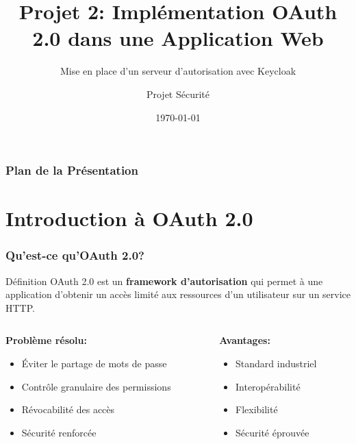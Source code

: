\documentclass[aspectratio=169]{beamer}
\title[OAuth 2.0 avec Keycloak]{Projet 2: Implémentation OAuth 2.0 dans une Application Web}
\subtitle{Mise en place d'un serveur d'autorisation avec Keycloak}
\author{Projet Sécurité}
\institute{Université}
\date{\today}
\begin{document}
\begin{frame}
    \titlepage
\end{frame}

\begin{frame}
    \frametitle{Plan de la Présentation}
    \tableofcontents
\end{frame}

\section{Introduction à OAuth 2.0}

\begin{frame}
    \frametitle{Qu'est-ce qu'OAuth 2.0?}
    \begin{block}{Définition}
        OAuth 2.0 est un \textbf{framework d'autorisation} qui permet à une application d'obtenir un accès limité aux ressources d'un utilisateur sur un service HTTP.
    \end{block}
    
    \begin{columns}
        \begin{column}{0.5\textwidth}
            \textbf{Problème résolu:}
            \begin{itemize}
                \item Éviter le partage de mots de passe
                \item Contrôle granulaire des permissions
                \item Révocabilité des accès
                \item Sécurité renforcée
            \end{itemize}
        \end{column}
        \begin{column}{0.5\textwidth}
            \textbf{Avantages:}
            \begin{itemize}
                \item Standard industriel
                \item Interopérabilité
                \item Flexibilité
                \item Sécurité éprouvée
            \end{itemize}
        \end{column}
    \end{columns}
\end{frame}
\end{document}
